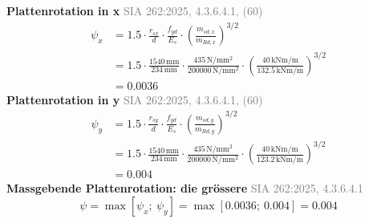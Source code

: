 \documentclass[11pt,a4paper]{article}
\newcommand{\normref}[1]{{\small\textcolor{gray}{#1}}}
\begin{document}
\noindent\textbf{Plattenrotation in x} \hfill \normref{SIA 262:2025, 4.3.6.4.1, (60)}
\begin{equation*}
\begin{aligned}
  \psi_x &= 1.5 \cdot \frac{r_{sx}}{d} \cdot \frac{f_{yd}}{E_s} \cdot \left(\frac{m_{sd,x}}{m_{Rd,x}}\right)^{3/2} \\
  &= 1.5 \cdot \frac{1540\,\mathrm{mm}}{234\,\mathrm{mm}} \cdot \frac{435\,\mathrm{N}/\mathrm{mm}^{2}}{200000\,\mathrm{N}/\mathrm{mm}^{2}} \cdot \left(\frac{40\,\mathrm{kNm}/\mathrm{m}}{132.5\,\mathrm{kNm}/\mathrm{m}}\right)^{3/2} \\
  &= 0.0036
\end{aligned}
\end{equation*}
\noindent\textbf{Plattenrotation in y} \hfill \normref{SIA 262:2025, 4.3.6.4.1, (60)}
\begin{equation*}
\begin{aligned}
  \psi_y &= 1.5 \cdot \frac{r_{sy}}{d} \cdot \frac{f_{yd}}{E_s} \cdot \left(\frac{m_{sd,y}}{m_{Rd,y}}\right)^{3/2} \\
  &= 1.5 \cdot \frac{1540\,\mathrm{mm}}{234\,\mathrm{mm}} \cdot \frac{435\,\mathrm{N}/\mathrm{mm}^{2}}{200000\,\mathrm{N}/\mathrm{mm}^{2}} \cdot \left(\frac{40\,\mathrm{kNm}/\mathrm{m}}{123.2\,\mathrm{kNm}/\mathrm{m}}\right)^{3/2} \\
  &= 0.004
\end{aligned}
\end{equation*}
\noindent\textbf{Massgebende Plattenrotation: die grössere} \hfill \normref{SIA 262:2025, 4.3.6.4.1}
\begin{equation*}
\psi = \max\left[\psi_x;\ \psi_y\right] = \max\left[0.0036;\ 0.004\right] = 0.004
\end{equation*}
\end{document}
